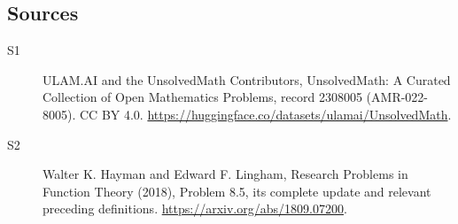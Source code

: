 \documentclass[11pt]{article}
\begin{document}
\subsection{Sources}
\begin{description}
\item[\hypertarget{source:2308005:1}{S1}] ULAM.AI and the UnsolvedMath Contributors, UnsolvedMath: A Curated Collection of Open Mathematics Problems, record 2308005 (AMR-022-8005). CC BY 4.0. \url{https://huggingface.co/datasets/ulamai/UnsolvedMath}.
\item[\hypertarget{source:2308005:2}{S2}] Walter K. Hayman and Edward F. Lingham, Research Problems in Function Theory (2018), Problem 8.5, its complete update and relevant preceding definitions. \url{https://arxiv.org/abs/1809.07200}.
\end{description}
\label{end:2308005}
\end{document}
